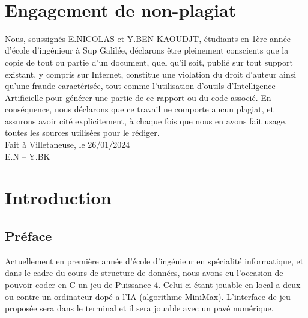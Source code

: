 \documentclass[a4paper,fleqn]{article}
\begin{document}
 \pagebreak
 
  ~
  
 \pagebreak
 
 \section*{Engagement de non-plagiat}

\vspace{0.5cm}
Nous, soussignés E.NICOLAS et Y.BEN KAOUDJT, étudiants en 1ère année d'école d'ingénieur à Sup Galilée,
déclarons être pleinement conscients que la copie de tout ou partie d'un document, quel qu'il
soit, publié sur tout support existant, y compris sur Internet, constitue une violation du droit
d'auteur ainsi qu'une fraude caractérisée, tout comme l’utilisation d’outils d’Intelligence
Artificielle pour générer une partie de ce rapport ou du code associé.
En conséquence, nous déclarons que ce travail ne comporte aucun plagiat, et assurons avoir cité
explicitement, à chaque fois que nous en avons fait usage, toutes les sources utilisées pour le
rédiger.\\

\hspace{9.7cm}Fait à Villetaneuse, le 26/01/2024\\

\hspace{13cm}E.N -- Y.BK

\begin{figure}[h]
        \centering
     
    \end{figure}

\pagebreak

\tableofcontents
\vspace{1cm}
\lstlistoflistings

\pagebreak

\section{Introduction}

\subsection{Préface}

Actuellement en première année d'école d'ingénieur en spécialité informatique, et dans le cadre du cours de structure de données, nous avons eu l'occasion de pouvoir coder en C un jeu de Puissance 4. Celui-ci étant jouable en local a deux ou contre un ordinateur dopé a l'IA (algorithme MiniMax). L'interface de jeu proposée sera dans le terminal et il sera jouable avec un pavé numérique.
\end{document}
